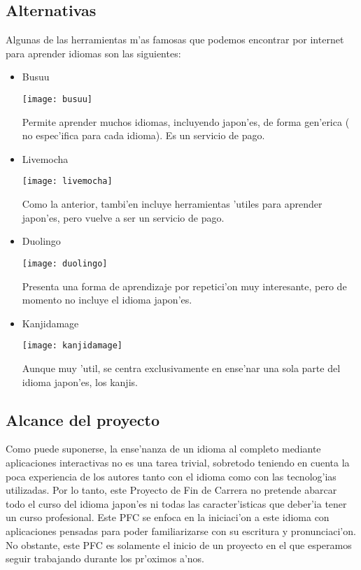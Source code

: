 \subsection{Alternativas}
\label{sub:alternativas}
Algunas de las herramientas m'as famosas que podemos encontrar por internet para aprender idiomas son las siguientes:
\begin{itemize}
 \item Busuu
 
\texttt{[image: busuu]}

 Permite aprender muchos idiomas, incluyendo japon'es, de forma gen'erica ( no espec'ifica para cada idioma). Es un servicio de pago.
 \item Livemocha
 
 \texttt{[image: livemocha]}
 
 Como la anterior, tambi'en incluye herramientas 'utiles para aprender japon'es, pero vuelve a ser un servicio de pago.
 \item Duolingo
 
 \texttt{[image: duolingo]}
 
 Presenta una forma de aprendizaje por repetici'on muy interesante, pero de momento no incluye el idioma japon'es.
 \item Kanjidamage
 
 \texttt{[image: kanjidamage]}
 
 Aunque muy 'util, se centra exclusivamente en ense'nar una sola parte del idioma japon'es, los kanjis.
\end{itemize}


\subsection{Alcance del proyecto}
\label{sub:alcance_del_proyecto}
Como puede suponerse, la ense'nanza de un idioma al completo mediante aplicaciones interactivas no es
una tarea trivial, sobretodo teniendo en cuenta la poca experiencia de los autores tanto con el idioma
como con las tecnolog'ias utilizadas. Por lo tanto, este Proyecto de Fin de Carrera no pretende abarcar todo el
curso del idioma japon'es ni todas las caracter'isticas que deber'ia tener un curso profesional.
Este PFC se enfoca en la iniciaci'on a este idioma con aplicaciones pensadas para poder familiarizarse
con su escritura y pronunciaci'on. No obstante, este PFC es solamente el inicio de un proyecto en el que
esperamos seguir trabajando durante los pr'oximos a'nos.

